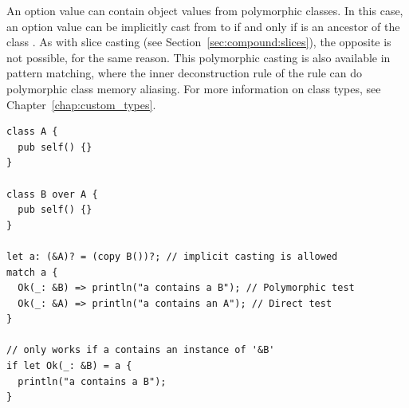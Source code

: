 An option value can contain object values from polymorphic classes. In this
case, an option value can be implicitly cast from  to  if
and only if  is an ancestor of the class . As with slice
casting (see Section~\ref{sec:compound:slices}), the opposite is not possible, for the
same reason. This
polymorphic casting is also available in pattern matching, where the inner
deconstruction rule of the  rule can do polymorphic class memory
aliasing. For more information on class types, see
Chapter~\ref{chap:custom_types}.

\begin{lstlisting}[style=coloredverbatim]
class A {
  pub self() {}
}

class B over A {
  pub self() {}
}

let a: (&A)? = (copy B())?; // implicit casting is allowed
match a {
  Ok(_: &B) => println("a contains a B"); // Polymorphic test
  Ok(_: &A) => println("a contains an A"); // Direct test
}

// only works if a contains an instance of '&B'
if let Ok(_: &B) = a {
  println("a contains a B");
}
\end{lstlisting}

